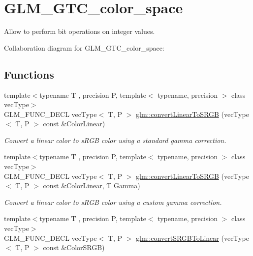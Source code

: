 \hypertarget{group__gtc__color__space}{\section{G\-L\-M\-\_\-\-G\-T\-C\-\_\-color\-\_\-space}
\label{group__gtc__color__space}
}


Allow to perform bit operations on integer values.  


Collaboration diagram for G\-L\-M\-\_\-\-G\-T\-C\-\_\-color\-\_\-space\-:
\subsection*{Functions}
\begin{DoxyCompactItemize}
\item 
\hypertarget{group__gtc__color__space_gad813dcd99644cafc775e83d6504ccb93}{{\footnotesize template$<$typename T , precision P, template$<$ typename, precision $>$ class vec\-Type$>$ }\\G\-L\-M\-\_\-\-F\-U\-N\-C\-\_\-\-D\-E\-C\-L vec\-Type$<$ T, P $>$ \hyperlink{group__gtc__color__space_gad813dcd99644cafc775e83d6504ccb93}{glm\-::convert\-Linear\-To\-S\-R\-G\-B} (vec\-Type$<$ T, P $>$ const \&Color\-Linear)}\label{group__gtc__color__space_gad813dcd99644cafc775e83d6504ccb93}

\begin{DoxyCompactList}\small\item\em Convert a linear color to s\-R\-G\-B color using a standard gamma correction. \end{DoxyCompactList}\item 
\hypertarget{group__gtc__color__space_ga63f8b003da7acf44370eb47bfb8b3d42}{{\footnotesize template$<$typename T , precision P, template$<$ typename, precision $>$ class vec\-Type$>$ }\\G\-L\-M\-\_\-\-F\-U\-N\-C\-\_\-\-D\-E\-C\-L vec\-Type$<$ T, P $>$ \hyperlink{group__gtc__color__space_ga63f8b003da7acf44370eb47bfb8b3d42}{glm\-::convert\-Linear\-To\-S\-R\-G\-B} (vec\-Type$<$ T, P $>$ const \&Color\-Linear, T Gamma)}\label{group__gtc__color__space_ga63f8b003da7acf44370eb47bfb8b3d42}

\begin{DoxyCompactList}\small\item\em Convert a linear color to s\-R\-G\-B color using a custom gamma correction. \end{DoxyCompactList}\item 
\hypertarget{group__gtc__color__space_ga28e98e64347cf385cadc1ceb4def55c9}{{\footnotesize template$<$typename T , precision P, template$<$ typename, precision $>$ class vec\-Type$>$ }\\G\-L\-M\-\_\-\-F\-U\-N\-C\-\_\-\-D\-E\-C\-L vec\-Type$<$ T, P $>$ \hyperlink{group__gtc__color__space_ga28e98e64347cf385cadc1ceb4def55c9}{glm\-::convert\-S\-R\-G\-B\-To\-Linear} (vec\-Type$<$ T, P $>$ const \&Color\-S\-R\-G\-B)}\label{group__gtc__color__space_ga28e98e64347cf385cadc1ceb4def55c9}


\end{DoxyCompactItemize}
